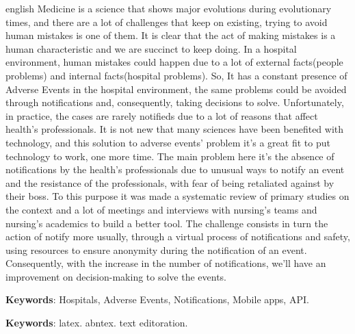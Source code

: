 \setlength{\absparsep}{18pt} %
\begin{resumo}[Abstract]
 \begin{otherlanguage*}{english}
   Medicine is a science that shows major evolutions during evolutionary times, and there are a lot of challenges that keep on existing, trying to avoid human mistakes is one of them. It is clear that the act of making mistakes is a human characteristic and we are succinct to keep doing. In a hospital environment, human mistakes could happen due to a lot of external facts(people problems) and internal facts(hospital problems). So, It has a constant presence of Adverse Events in the hospital environment, the same problems could be avoided through notifications and, consequently, taking decisions to solve. Unfortunately, in practice, the cases are rarely notifieds due to a lot of reasons that affect health’s professionals. It is not new that many sciences have been benefited with technology, and this solution to adverse events’ problem it’s a great fit to put technology to work, one more time. The main problem here it’s the absence of notifications by the health’s professionals due to unusual ways to notify an event and the resistance of the professionals, with fear of being retaliated against by their boss. To this purpose it was made a systematic review of primary studies on the context and a lot of meetings and interviews with nursing’s teams and nursing’s academics to build a better tool. The challenge consists in turn the action of notify more usually, through a virtual process of notifications and safety, using resources to ensure anonymity during the notification of an event. Consequently, with the increase in the number of notifications, we’ll have an improvement on decision-making to solve the events.

   \vspace{\onelineskip}
 
   \noindent 
   \textbf{Keywords}: Hospitals, Adverse Events, Notifications, Mobile apps, API.
   
   \textbf{Keywords}: latex. abntex. text editoration.
 \end{otherlanguage*}
\end{resumo}